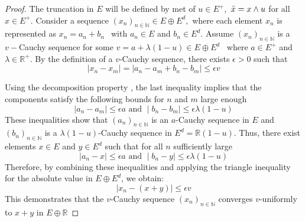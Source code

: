 \documentclass{birkau}
\numberwithin{equation}{section}
\theoremstyle{plain}
\theoremstyle{definition}
\begin{document}
\begin{proof}
	The truncation in $E$ will be defined by met of $u\in E^{+},$ $\bar{%
		x}=x\wedge u$ for all $x\in E^{+}.$
	Consider a sequence $\left( x_{n}\right) _{n\in 
		\mathbb{N}
	}\in E\oplus E^{d},$ where each element $x_{n}$ is represented as $%
	x_{n}=a_{n}+b_{n\text{ }}$ with $a_{n}\in E$ and $b_{n}\in E^{d}.$ Assume $%
	\left( x_{n}\right) _{n\in 
		\mathbb{N}
	}$ is a $v-$Cauchy sequence for some $v=a+\lambda \left( 1-u\right) \in
	E\oplus E^{d}$ \ where $a\in E^{+}$ and $\lambda \in 
	\mathbb{R}
	^{+}.$ By the definition of a $v$-Cauchy sequence,  there exists $\epsilon >0$ such that 
	\begin{equation*}
		\mid x_{n}-x_{m}\mid =\mid a_{n}-a_{m}+b_{n}-b_{m}\mid \leq \epsilon v 
	\end{equation*}
	
	Using the decomposition property \cite[Theorem 1.13]{positiveoperator},  the last inequality implies that the components satisfy the following
	bounds for $n$ and $m$ large enough
	\begin{equation*}
		\mid a_{n}-a_{m}\mid \leq \epsilon  a\text{ and }\mid b_{n}-b_{m}\mid
		\leq \epsilon \lambda \left( 1-u\right) 
	\end{equation*}%
	These inequalities show that $\left( a_{n}\right) _{n\in 
		\mathbb{N}
	}$ is an $a$-Cauchy sequence in $E$ and $\left( b_{n}\right) _{n\in 
		\mathbb{N}
	}$ is a $\lambda (1-u)$-Cauchy sequence in $E^{d}=%
	\mathbb{R}
	\left( 1-u\right) .$ Thus, there exist elements $x\in E$ and $y\in E^{d}$
	such that for all $n$ sufficiently large
	\begin{equation*}
		\mid a_{n}-x\mid \leq \epsilon a\text{ and }\mid b_{n}-y\mid \leq
		\epsilon \lambda \left( 1-u\right) 
	\end{equation*}%
	Therefore,  by combining these inequalities and applying the triangle inequality
	for the absolute value in $E\oplus E^{d}$, we obtain:%
	\begin{equation*}
		\mid x_{n}-(x+y)\mid \leq \epsilon v
	\end{equation*}%
	This demonstrates that the $v$-Cauchy sequence $\left( x_{n}\right) _{n\in 
		\mathbb{N}
	}$ converges $v$-uniformly to $x+y$ in $E\oplus 
	\mathbb{R}
	$
\end{proof}
\end{document}
